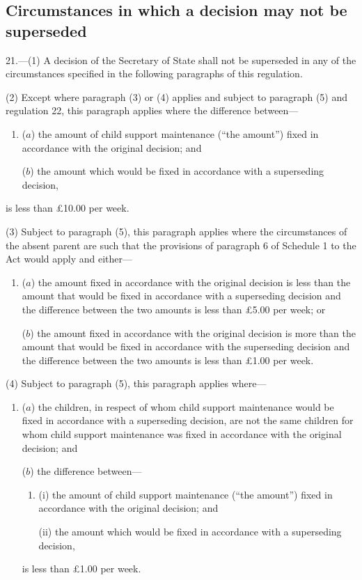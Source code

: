 \documentclass[a4paper,12pt]{article}
\begin{document}
\subsection[21. Circumstances in which a decision may not be superseded]{Circumstances in which a decision may not be superseded}

21.—(1) A decision of the Secretary of State shall not be superseded in any of the circumstances specified in the following paragraphs of this regulation.

(2) Except where paragraph (3) or (4) applies and subject to paragraph (5) and regulation 22, this paragraph applies where the difference between---
\begin{enumerate}\item[]
\begin{sloppypar}
($a$) the amount of child support maintenance (“the amount”) fixed in accordance with the original decision; and
\end{sloppypar}

($b$) the amount which would be fixed in accordance with a superseding decision,
\end{enumerate}
is less than £10.00 per week.

(3) Subject to paragraph (5), this paragraph applies where the circumstances of the absent parent are such that the provisions of paragraph 6 of Schedule 1 to the Act would apply and either---
\begin{enumerate}\item[]
($a$) the amount fixed in accordance with the original decision is less than the amount that would be fixed in accordance with a superseding decision and the difference between the two amounts is less than £5.00 per week; or

($b$) the amount fixed in accordance with the original decision is more than the amount that would be fixed in accordance with the superseding decision and the difference between the two amounts is less than £1.00 per week.
\end{enumerate}

(4) Subject to paragraph (5), this paragraph applies where---
\begin{enumerate}\item[]
($a$) the children, in respect of whom child support maintenance would be fixed in accordance with a superseding decision, are not the same children for whom child support maintenance was fixed in accordance with the original decision; and

($b$) the difference between---
\begin{enumerate}\item[]
(i) the amount of child support maintenance (“the amount”) fixed in accordance with the original decision; and

(ii) the amount which would be fixed in accordance with a superseding decision, 
\end{enumerate}
is less than £1.00 per week.
\end{enumerate}
\end{document}
